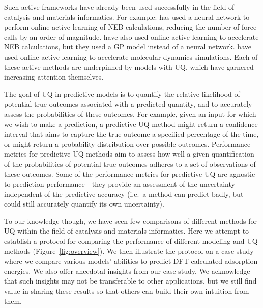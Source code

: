 \documentclass[]{achemso}
\begin{document}
Such active frameworks have already been used successfully in the field of catalysis and materials informatics.
For example: \citet{Peterson2016} has used a neural network to perform online active learning of \gls{NEB} calculations, reducing the number of force calls by an order of magnitude.
\citet{Torres2018} have also used online active learning to accelerate \gls{NEB} calculations, but they used a \gls{GP} model instead of a neural network.
\citet{Jinnouchi2019} have used online active learning to accelerate molecular dynamics simulations.
Each of these active methods are underpinned by models with \gls{UQ}, which have garnered increasing attention themselves.\cite{Peterson2017, Musil2019}

The goal of \gls{UQ} in predictive models is to quantify the relative likelihood of potential true outcomes associated with a predicted quantity, and to accurately assess the probabilities of these outcomes.
For example, given an input for which we wish to make a prediction, a predictive \gls{UQ} method might return a confidence interval that aims to capture the true outcome a specified percentage of the time, or might return a probability distribution over possible outcomes.
Performance metrics for predictive \gls{UQ} methods aim to assess how well a given quantification of the probabilities of potential true outcomes adheres to a set of observations of these outcomes.
Some of the performance metrics for predictive \gls{UQ} are agnostic to prediction performance---they provide an assessment of the uncertainty independent of the predictive accuracy (i.e.\ a method can predict badly, but could still accurately quantify its own uncertainty).

To our knowledge though, we have seen few\cite{Janet2019} comparisons of different methods for \gls{UQ} within the field of catalysis and materials informatics.
Here we attempt to establish a protocol for comparing the performance of different modeling and \gls{UQ} methods (Figure~\ref{fig:overview}).
We then illustrate the protocol on a case study where we compare various models' abilities to predict \gls{DFT} calculated adsorption energies.
We also offer anecdotal insights from our case study.
We acknowledge that such insights may not be transferable to other applications, but we still find value in sharing these results so that others can build their own intuition from them.
\end{document}
